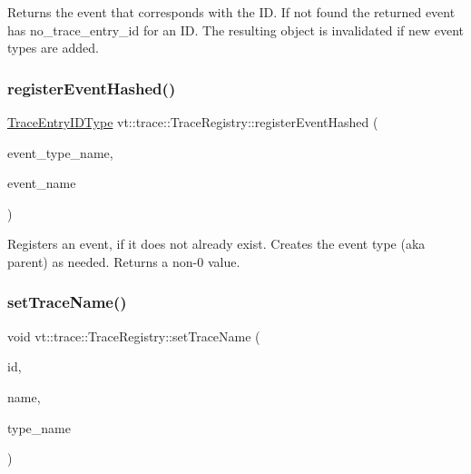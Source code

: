 Returns the event that corresponds with the ID. If not found the returned event has no\+\_\+trace\+\_\+entry\+\_\+id for an ID. The resulting object is invalidated if new event types are added. \mbox{\label{structvt_1_1trace_1_1_trace_registry_a557118b7661378a6c74ed693b87c3d83}} 
\subsubsection{\texorpdfstring{register\+Event\+Hashed()}{registerEventHashed()}}
{\footnotesize\ttfamily \hyperlink{namespacevt_1_1trace_a3c14050715ba9eceaeff51fb3de64f2f}{Trace\+Entry\+I\+D\+Type} vt\+::trace\+::\+Trace\+Registry\+::register\+Event\+Hashed (\begin{DoxyParamCaption}\item[{std\+::string const \&}]{event\+\_\+type\+\_\+name,  }\item[{std\+::string const \&}]{event\+\_\+name }\end{DoxyParamCaption})\hspace{0.3cm}{\ttfamily [static]}}

Registers an event, if it does not already exist. Creates the event type (aka parent) as needed. Returns a non-\/0 value. \mbox{\label{structvt_1_1trace_1_1_trace_registry_ac7de433a12632737154a38ed50bbc82e}} 
\subsubsection{\texorpdfstring{set\+Trace\+Name()}{setTraceName()}}
{\footnotesize\ttfamily void vt\+::trace\+::\+Trace\+Registry\+::set\+Trace\+Name (\begin{DoxyParamCaption}\item[{\hyperlink{namespacevt_1_1trace_a3c14050715ba9eceaeff51fb3de64f2f}{Trace\+Entry\+I\+D\+Type}}]{id,  }\item[{std\+::string const \&}]{name,  }\item[{std\+::string const \&}]{type\+\_\+name }\end{DoxyParamCaption})\hspace{0.3cm}{\ttfamily [static]}}

